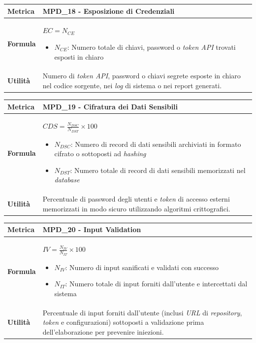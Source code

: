 \documentclass[12pt, a4paper]{article}
\begin{document}
\begin{table}[H]
\centering
\renewcommand{\arraystretch}{1.5}
\begin{tabular}{|l|p{12cm}|}
\hline
\textbf{Metrica} & MPD\_18 - Esposizione di Credenziali \\ \hline
\textbf{Formula} & $EC = N_{CE}$
\begin{itemize}
    \item $N_{CE}$: Numero totale di chiavi, password o \textit{token API} trovati esposti in chiaro
\end{itemize} \\ \hline
\textbf{Utilità} & Numero di \textit{token API}, password o chiavi segrete esposte in chiaro nel codice sorgente, nei \textit{log} di sistema o nei report generati. \\ \hline
\end{tabular}
\end{table}

\begin{table}[H]
\centering
\renewcommand{\arraystretch}{1.5}
\begin{tabular}{|l|p{12cm}|}
\hline
\textbf{Metrica} & MPD\_19 - Cifratura dei Dati Sensibili \\ \hline
\textbf{Formula} & $CDS = \frac{N_{DSC}}{N_{DST}} \times 100$
\begin{itemize}
    \item $N_{DSC}$: Numero di record di dati sensibili archiviati in formato cifrato o sottoposti ad \textit{hashing}
    \item $N_{DST}$: Numero totale di record di dati sensibili memorizzati nel \textit{database}
\end{itemize} \\ \hline
\textbf{Utilità} & Percentuale di password degli utenti e \textit{token} di accesso esterni memorizzati in modo sicuro utilizzando algoritmi crittografici. \\ \hline
\end{tabular}
\end{table}

\begin{table}[H]
\centering
\renewcommand{\arraystretch}{1.5}
\begin{tabular}{|l|p{12cm}|}
\hline
\textbf{Metrica} & MPD\_20 - Input Validation \\ \hline
\textbf{Formula} & $IV = \frac{N_{IV}}{N_{IT}} \times 100$
\begin{itemize}
    \item $N_{IV}$: Numero di input sanificati e validati con successo
    \item $N_{IT}$: Numero totale di input forniti dall'utente e intercettati dal sistema
\end{itemize} \\ \hline
\textbf{Utilità} & Percentuale di input forniti dall'utente (inclusi \textit{URL} di \textit{repository}, \textit{token} e configurazioni) sottoposti a validazione prima dell'elaborazione per prevenire iniezioni. \\ \hline
\end{tabular}
\end{table}
\end{document}
